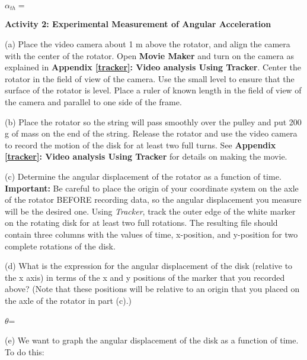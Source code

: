 \( \alpha _{th}= \)
\answerspace{5mm}

\textbf{Activity 2: Experimental Measurement of Angular Acceleration} 

(a) Place the video camera about 1 m above the rotator, and align the camera with the 
center of the rotator. Open \textbf{Movie Maker} and turn on the camera as explained in \textbf{Appendix \ref{tracker}: Video analysis Using Tracker}. Center the rotator in the 
field of view of the camera. Use the small level to ensure that the surface of the rotator 
is level. Place a ruler of known length in the field of view of the camera and parallel to 
one side of the frame.

(b) Place the rotator so the string will pass smoothly over the pulley and put
200 g of mass on the end of the string. Release the rotator and use the
video camera to record the motion of the disk for at least two full turns. See  
\textbf{Appendix \ref{tracker}: Video analysis Using Tracker} for details on 
making the movie.

(c) Determine the angular displacement of the rotator as a function of time. \textbf{Important:} Be careful to place the origin of your coordinate system on the axle of the rotator BEFORE recording data, so the angular displacement you measure will be the desired one. Using \textit{Tracker}, track the outer edge of the white marker on the rotating disk for at least two full rotations. The resulting file should contain three columns with the values of time, x-position, and y-position for two complete rotations of the disk.

\pagebreak[2]
(d) What is the expression for the angular displacement of the disk (relative to the x axis) in terms of the x and y positions of the marker that you recorded above? (Note that these positions will be relative to an origin that you placed on the axle of the rotator in part (c).)
\vspace{5mm}

\( \theta  \)= 
\bigskip

\newpage
(e) We want to graph the angular displacement of the disk as a function of time.
To do this:

